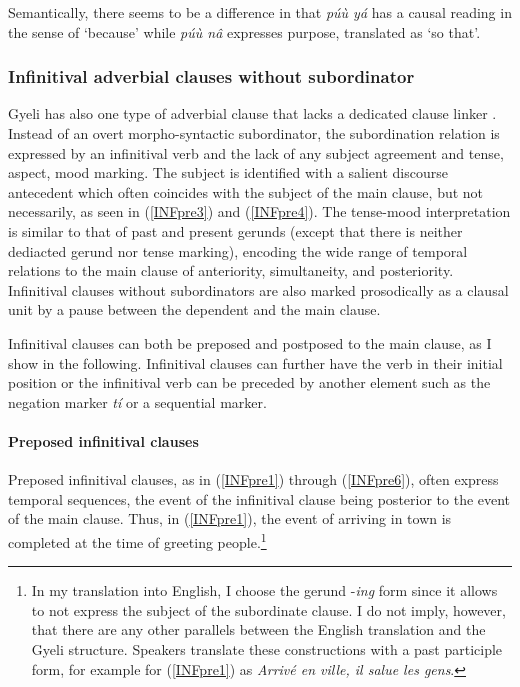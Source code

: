 \noindent Semantically, there seems to be a difference in that {\itshape púù yá} has a causal reading in the sense of `because' while {\itshape púù nâ}  expresses purpose, translated as `so that'.





\subsubsection[Infinitival adverbial clauses]{Infinitival adverbial clauses without subordinator}
\label{sec:InfSub}

Gyeli has also one type of adverbial clause that lacks a dedicated clause linker \citep[109]{hetterle2015}. Instead of an overt morpho-syntactic subordinator, the subordination relation is expressed by an infinitival verb and the lack of any subject agreement and tense, aspect, mood marking. The subject is identified with a salient discourse antecedent which often coincides with the subject of the main clause, but not necessarily, as seen in (\ref{INFpre3}) and (\ref{INFpre4}). The tense-mood interpretation is similar to that of past and present gerunds (except that there is neither dediacted gerund nor tense marking), encoding the wide range of temporal relations to the main clause of anteriority, simultaneity, and posteriority.
Infinitival clauses without subordinators are also marked prosodically as a clausal unit by a pause between the dependent and the main clause.


 Infinitival clauses can both be preposed and postposed to the main clause, as I show in the following. Infinitival clauses can further have the verb in their initial position or the infinitival verb can be preceded by another element such as the negation marker {\itshape tí} or a sequential marker.

\paragraph{Preposed infinitival clauses}
Preposed infinitival clauses, as in (\ref{INFpre1}) through (\ref{INFpre6}), often express temporal sequences, the event of the infinitival clause being posterior to the event of the main clause. Thus, in (\ref{INFpre1}), the event of arriving in town is completed at the time of greeting people.\footnote{In my translation into English, I choose the gerund -{\itshape ing} form since it allows to not express the subject of the subordinate clause. I do not imply, however, that there are any other parallels between the English translation and the Gyeli structure. Speakers translate these constructions with a past participle form, for example for (\ref{INFpre1}) as {\itshape Arrivé en ville, il salue les gens}.}


